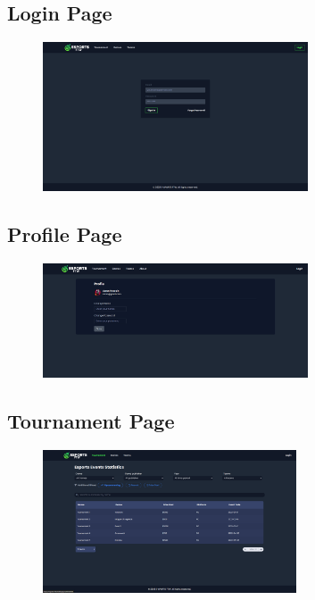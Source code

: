 \clearpage
\subsection{Login Page}
\begin{figure}[h]
    \centering
    \includegraphics[width=0.7\textwidth]{Chapter 3/UI/login-page}
    \label{fig:Login Page}
\end{figure}

\subsection{Profile Page}
\begin{figure}[h]
    \centering
    \includegraphics[width=0.7\textwidth]{Chapter 3/UI/profile-page}
    \label{fig:profile Page}
\end{figure}

\subsection{Tournament Page}
\begin{figure}[h]
    \centering
    \includegraphics[width=0.67\textwidth]{Chapter 3/UI/tournament-page}
    \label{fig:Tournament Page}
\end{figure}
\clearpage
